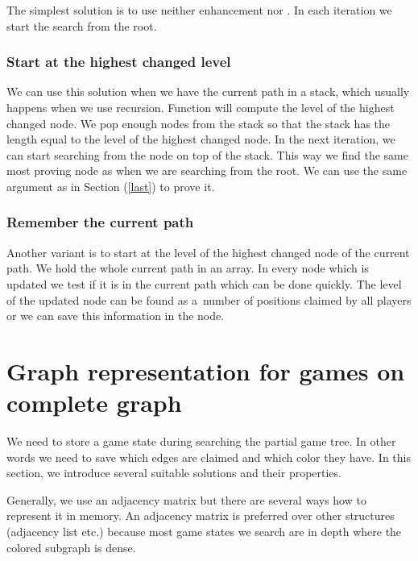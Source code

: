 The simplest solution is to use neither enhancement 
nor . In each iteration we start the search from the root.

\subsubsection{Start at the highest changed level}

We can use this solution when we have the current path in a stack, which usually
happens when we use recursion. Function  will compute the level of
the highest changed node. We pop enough nodes from the stack so that the stack has
the length equal to the level of the highest changed node. In the next iteration, we can
start searching from the node on top of the stack. This way
we find the same most proving node as when we are searching from the root. We can
use the same argument as in Section  (\ref{last}) to prove it.

\subsubsection{Remember the current path}

Another variant is to start at the level of the highest changed node of the current path.
We hold the whole current path in an array. In every
node which is updated we test if it is in the current path which can be done
quickly. The level of the updated node can be found as a~number of positions
claimed by all players or we can save this information in the node.


\section{Graph representation for games on complete graph} 

We need to store a game state during searching the partial game tree. In other words we
need to save which edges are claimed and which color they have. In
this section, we introduce several suitable solutions and their properties.

Generally, we use an adjacency matrix but there are several ways how to
represent it in memory. An adjacency matrix is preferred over other structures
(adjacency list etc.) because most game states we search are in depth where the
colored subgraph is dense.

